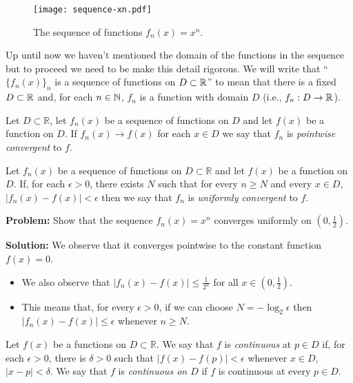 \begin{figure}
  \begin{center}
    \texttt{[image: sequence-xn.pdf]}
    \caption{The sequence of functions \(f_n(x)= x^n\).}
  \end{center}
\end{figure}

\noindent
Up until now we haven't mentioned the domain of the functions in the sequence but to proceed we need to be make this detail rigorous.
We will write that ``\({\{f_n(x)\}}_{n}\) is a sequence of functions on \(D\subset \mathbb{R}\)'' to mean that there is a fixed \(D\subset \mathbb{R}\) and, for each \(n\in \mathbb{N}\), \(f_{n}\) is a function with domain \(D\) (i.e., \(f_n : D \to \mathbb{R}\)).


\begin{definition}
  Let \(D\subset \mathbb{R}\),
  let \(f_n(x)\) be a sequence of functions on \(D\)
  and let \(f(x)\) be a function on \(D\).
  If \(f_n(x) \to f(x)\) for each \(x\in D\) we say that \(f_n\) is \emph{pointwise convergent} to \(f\).
\end{definition}

\begin{definition}
  Let \(f_n(x)\) be a sequence of functions on \(D\subset \mathbb{R}\)
  and let \(f(x)\) be a function on \(D\).
  If, for each \(\epsilon>0\), there exists \(N\) such that for every \(n\geq N\) and every \(x\in D\), \(|f_n(x) - f(x)| < \epsilon\) then we say that \(f_n\) is \emph{uniformly convergent} to \(f\).
\end{definition}

\noindent
\textbf{Problem:}
Show that the sequence \(f_n(x) = x^n\) converges uniformly on \((0,\frac{1}{2})\).

\noindent
\textbf{Solution:}
We observe that it converges pointwise to the constant function \(f(x)=0\).
\begin{itemize}
  \item We also observe that \(|f_n(x) - f(x) | \leq \frac{1}{2^n}\) for all \(x\in (0,\frac{1}{2})\).
  \item This means that, for every \(\epsilon>0\), if we can choose \(N=-\log_{2}\epsilon\) then \(|f_n(x) - f(x) | \leq \epsilon\) whenever \(n\geq N\).
\end{itemize}


\begin{definition}
  Let \(f(x)\) be a functions on \(D\subset \mathbb{R}\).
  We say that \(f\) is \emph{continuous} at \(p\in D\) if, for each \(\epsilon>0\), there is \(\delta >0\) such that \(|f(x)-f(p)| <\epsilon\) whenever \(x\in D\), \(|x-p| <\delta\).
  We say that \(f\) is \emph{continuous on \( D\)} if \(f\) is continuous at every \(p\in D\).
\end{definition}




